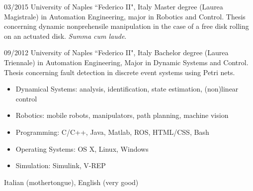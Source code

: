 \documentclass{DFCV}
\begin{document}

		      {03/2015}
	   	      {University of Naples ``Federico II", Italy}
		      {Master degree (Laurea Magistrale) in Automation Engineering, major in Robotics and Control. Thesis concerning dynamic nonprehensile manipulation in the case of a free disk rolling on an actuated disk. \emph{Summa cum laude}.}
	
		      {09/2012}
		      {University of Naples ``Federico II", Italy}
		      {Bachelor degree (Laurea Triennale) in Automation Engineering, Major in Dynamic Systems and Control. Thesis concerning fault detection in discrete event systems using Petri nets. }
		   
		      {\begin{itemize} [noitemsep]
		      		\item Dynamical Systems: analysis, identification, state estimation, (non)linear control 
		      		\item Robotics: mobile robots, manipulators, path planning, machine vision
		       \end{itemize}
		       }
		      {\begin{itemize} [noitemsep]
		      		\item Programming: C/C++, Java, Matlab, ROS, HTML/CSS, Bash
		      		\item Operating Systems: OS X, Linux, Windows
		      		\item Simulation: Simulink, V-REP
		      	\end{itemize}
		      	}
			  {Italian (mothertongue), English (very good)}
\end{document}
